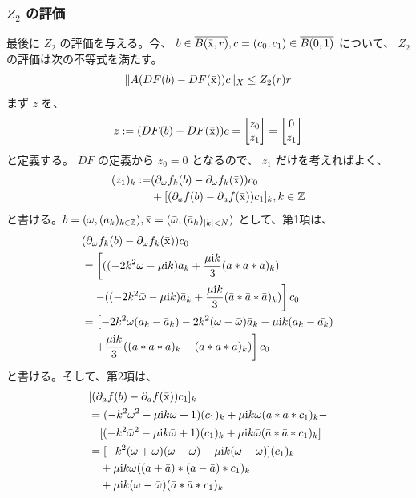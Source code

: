 \subsubsection{$Z_2$ の評価}
最後に $Z_2$ の評価を与える。今、
$b \in \overline{B(\bar{\mathrm x},r)}, c = (c_0, c_1) \in \overline{B(0,1)}$ について、 $Z_2$ の評価は次の不等式を満たす。
$$
    \| A(DF(b) - DF(\bar{\mathrm x}))c \|_X \leq Z_2 (r)r
$$
まず $z$ を、
$$
    z := (DF(b) - DF(\bar{\mathrm x}))c = 
    \begin{bmatrix}
    z_0 \\
    z_1 \\
    \end{bmatrix}
    =
    \begin{bmatrix}
    0 \\
    z_1 \\
    \end{bmatrix}
$$
と定義する。 $DF$ の定義から $z_0 = 0$ となるので、 $z_1$ だけを考えればよく、
\begin{align*}
    (z_1)_k := &(\partial_\omega f_k (b) - \partial_\omega f_k (\bar{\mathrm x})) c_0 \\
     &+ [(\partial_a f(b) - \partial_a f(\bar{\mathrm x}))c_1]_k , k \in \mathbb{Z}
\end{align*}
と書ける。$b = (\omega, (a_k)_{k \in \mathbb{Z}}), \bar{\mathrm x} = (\bar{\omega}, (\bar{a}_k)_{|k| < N})$ として、第1項は、
    \begin{align*}
    &(\partial_\omega f_k (b) - \partial_\omega f_k (\bar{\mathrm x}))c_0 \\
    &= \left[((- 2 k^2 \omega - \mu \mathrm{i} k)a_k + \frac{\mu \mathrm{i} k}{3} (a*a*a)_k) \right.\\
    &~~~\left. - (( - 2 k^2 \bar{\omega} - \mu \mathrm{i} k) \bar{a}_k + \frac{\mu \mathrm{i} k}{3}(\bar{a}*\bar{a}*\bar{a})_k)\right]c_0 \\
    &= \left[ -2k^2 \omega (a_k - \bar{a}_k) - 2 k^2 (\omega - \bar{\omega}) \bar{a}_k - \mu \mathrm{i} k (a_k - \bar{a_k}) \right.\\
    &\left. ~~~+ \frac{\mu \mathrm{i} k}{3}((a*a*a)_k - (\bar{a}*\bar{a}*\bar{a})_k) \right] c_0
    \end{align*}
と書ける。そして、第2項は、
    \begin{align*}
    &[(\partial_a f(b) - \partial_a f(\bar{\mathrm x}))c_1]_k \\
    &= (-k^2 \omega^2 - \mu \mathrm{i} k \omega +1)(c_1)_k + \mu \mathrm{i} k \omega (a*a*c_1)_k -\\
    &~~~[(-k^2 \bar{\omega}^2 - \mu \mathrm{i} k \bar{\omega} +1)(c_1)_k + \mu \mathrm{i} k \bar{\omega} (\bar{a}*\bar{a}*c_1)_k] \\
    &= [ -k^2 (\omega + \bar{\omega})(\omega - \bar{\omega}) - \mu \mathrm{i} k (\omega - \bar{\omega})](c_1)_k \\
    &~~~+ \mu \mathrm{i} k \omega ((a+\bar{a})*(a-\bar{a})*c_1)_k \\
    &~~~+ \mu \mathrm{i} k (\omega - \bar{\omega}) (\bar{a}*\bar{a}*c_1)_k
    \end{align*}
